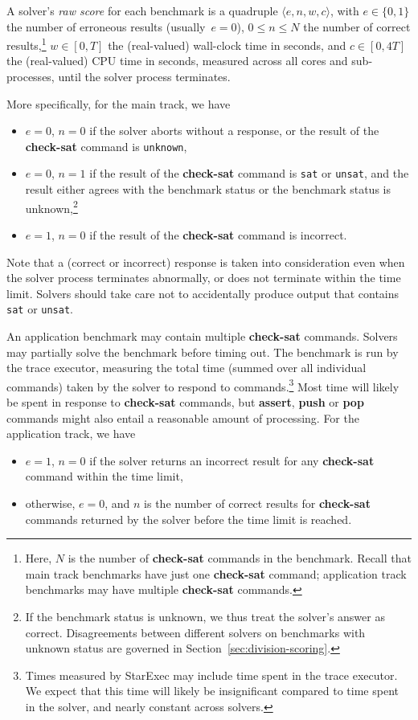 \documentclass[12pt]{article}
\newcommand{\akey}[1]{\textbf{#1}}
\begin{document}
A solver's \emph{raw score} for each benchmark is a quadruple $\langle
e, n, w, c\rangle$, with $e \in \{0, 1\}$ the number of erroneous
results (usually~$e = 0$), $0 \leq n \leq N$ the number of correct
results,\footnote{Here, $N$ is the number of \akey{check-sat} commands
  in the benchmark.  Recall that main track benchmarks have just one
  \akey{check-sat} command; application track benchmarks may have
  multiple \akey{check-sat} commands.} $w \in [0,T]$ the (real-valued)
wall-clock time in seconds, and $c \in [0, 4T]$ the (real-valued) CPU
time in seconds, measured across all cores and sub-processes, until
the solver process terminates.

 More specifically, for the main track, we have
%
\begin{itemize}
\item $e=0$, $n=0$ if the solver aborts without a response, or the
  result of the \akey{check-sat} command is \texttt{unknown},
\item $e=0$, $n=1$ if the result of the \akey{check-sat} command is
  \texttt{sat} or \texttt{unsat}, and the result either agrees with
  the benchmark status or the benchmark status is unknown,\footnote{If
    the benchmark status is unknown, we thus treat the solver's answer
    as correct.  Disagreements between different solvers on benchmarks
    with unknown status are governed in
    Section~\ref{sec:division-scoring}.}
\item $e=1$, $n=0$ if the result of the \akey{check-sat} command is
  incorrect.
\end{itemize}
%
Note that a (correct or incorrect) response is taken into
consideration even when the solver process terminates abnormally, or
does not terminate within the time limit.  Solvers should take care
not to accidentally produce output that contains \texttt{sat} or
\texttt{unsat}.

%
An application benchmark may contain multiple \akey{check-sat}
commands.  Solvers may partially solve the benchmark before timing
out.  The benchmark is run by the trace executor, measuring the total
time (summed over all individual commands) taken by the solver to
respond to commands.\footnote{Times measured by StarExec may include
  time spent in the trace executor.  We expect that this time will
  likely be insignificant compared to time spent in the solver, and
  nearly constant across solvers.}  Most time will likely be spent in
response to \akey{check-sat} commands, but \akey{assert}, \akey{push}
or \akey{pop} commands might also entail a reasonable amount of
processing.  For the application track, we have
\begin{itemize}
\item $e=1$, $n=0$ if the solver returns an incorrect result for any
  \akey{check-sat} command within the time limit,
\item otherwise, $e=0$, and $n$ is the number of correct results for
  \akey{check-sat} commands returned by the solver before the time
  limit is reached.
\end{itemize}
\end{document}
